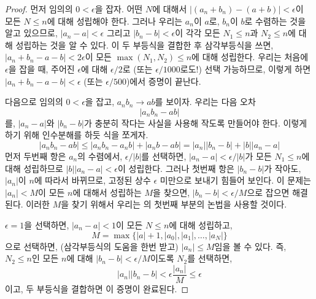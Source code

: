 \begin{proof}
    먼저 임의의 $0 < \epsilon$을 잡자.
    어떤 $N$에 대해서 $|(a_n + b_n) - (a + b)| < \epsilon$이 모든 $N \leq n$에 대해 성립해야 한다.
    그러나 우리는 $a_n$이 $a$로, $b_n$이 $b$로 수렴하는 것을 알고 있으므로, $|a_n - a| < \epsilon$ 그리고 $|b_n - b| < \epsilon$이 각각 모든 $N_1 \leq n$과 $N_2 \leq n$에 대해 성립하는 것을 알 수 있다.
    이 두 부등식을 결합한 후 삼각부등식을 쓰면, $|a_n + b_n - a - b| < 2\epsilon$이 모든 $\max(N_1, N_2) \leq n$에 대해 성립한다.
    우리는 처음에 $\epsilon$을 잡을 때, 주어진 $\epsilon$에 대해 $\epsilon/2$로 (또는 $\epsilon/1000$로도!) 선택 가능하므로, 이렇게 하면 $|a_n + b_n - a -b | <\epsilon$ (또는 $\epsilon/500$)에서 증명이 끝난다.

    다음으로 임의의 $0 < \epsilon$을 잡고, $a_n b_n \to ab$를 보이자.
    우리는 다음 오차
    \begin{equation*}
        |a_n b_n - ab|
    \end{equation*}
    를, $|a_n - a|$와 $|b_n - b|$가 충분히 작다는 사실을 사용해 작도록 만들어야 한다.
    이렇게 하기 위해 인수분해를 하듯 식을 쪼게자.
    \begin{equation*}
        |a_n b_n - ab| \leq |a_n b_n - a_n b| + |a_n b - ab| = |a_n| |b_n - b| + |b| |a_n - a|
    \end{equation*}
    먼저 두번째 항은 $a_n$의 수렴에서, $\epsilon/|b|$를 선택하면, $|a_n - a| < \epsilon/|b|$가 모든 $N_1 \leq n$에 대해 성립하므로 $|b| |a_n - a| < \epsilon$이 성립한다.
    그러나 첫번째 항은 $|b_n - b|$가 작아도, $|a_n|$이 $n$에 따라서 바뀌므로, 고정된 상수 $\epsilon$ 미만으로 보내기 힘들어 보인다.
    이 문제는 $|a_n| < M$이 모든 $n$에 대해서 성립하는 $M$을 찾으면, $|b_n - b| < \epsilon/M$으로 잡으면 해결된다.
    이러한 $M$을 찾기 위해서 우리는 의 첫번째 부분의 논법을 사용할 것이다.
    
    $\epsilon = 1$을 선택하면, $|a_n - a| < 1$이 모든 $N \leq n$에 대해 성립하고,
    \begin{equation*}
        M = \max \{ |a| + 1, |a_0|, |a_1|, \dots, |a_N| \}
    \end{equation*}
    으로 선택하면, (삼각부등식의 도움을 한번 받고) $|a_n| \leq M$임을 볼 수 있다.
    즉, $N_2 \leq n$인 모든 $n$에 대해 $|b_n - b| < \epsilon/M$이도록 $N_2$를 선택하면,
    \begin{equation*}
        |a_n| |b_n - b| < \epsilon \frac{|a_n|}{M} \leq \epsilon
    \end{equation*}
    이고, 두 부등식을 결합하면 이 증명이 완료된다.


\end{proof}
